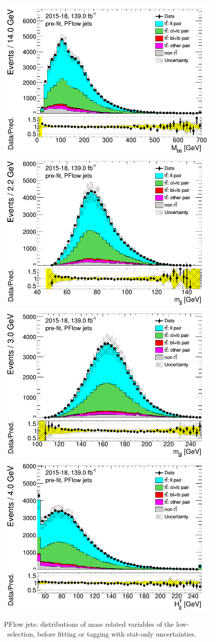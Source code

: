 \documentclass[letterpaper,12pt]{article}
\begin{document}
\newpage
\begin{figure}[H]
\includegraphics[width=.45\textwidth]{FTAG_plots/pretagNoRwLowpTPFlowall/DataMC_h_Mbb.png}
\includegraphics[width=.45\textwidth]{FTAG_plots/pretagNoRwLowpTPFlowall/DataMC_h_mjj.png}\\
\includegraphics[width=.45\textwidth]{FTAG_plots/pretagNoRwLowpTPFlowall/DataMC_h_mjjj.png}
\includegraphics[width=.45\textwidth]{FTAG_plots/pretagNoRwLowpTPFlowall/DataMC_h_Htjj.png}\\
\caption{PFlow jets: distributions of mass related variables of the low-\pt\ selection, 
before fitting or 
tagging with stat-only uncertainties.} \label{fig:lowpT_mass_PFlow}
\end{figure}
\end{document}
